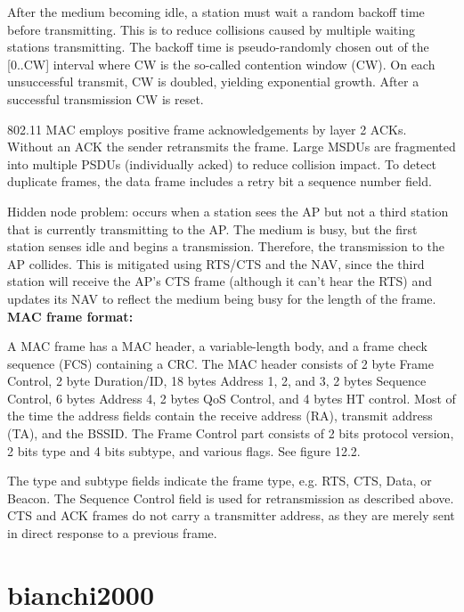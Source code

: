 After the medium becoming idle, a station must wait a random backoff time before transmitting. This is to reduce collisions caused by multiple waiting stations transmitting. The backoff time is pseudo-randomly chosen out of the [0..CW] interval where CW is the so-called contention window (CW). On each unsuccessful transmit, CW is doubled, yielding exponential growth. After a successful transmission CW is reset.

802.11 MAC employs positive frame acknowledgements by layer 2 ACKs. Without an ACK the sender retransmits the frame. Large MSDUs are fragmented into multiple PSDUs (individually acked) to reduce collision impact. To detect duplicate frames, the data frame includes a retry bit a sequence number field.

Hidden node problem: occurs when a station sees the AP but not a third station that is currently transmitting to the AP. The medium is busy, but the first station senses idle and begins a transmission. Therefore, the transmission to the AP collides. This is mitigated using RTS/CTS and the NAV, since the third station will receive the AP's CTS frame (although it can't hear the RTS) and updates its NAV to reflect the medium being busy for the length of the frame.\\

\textbf{MAC frame format:}

A MAC frame has a MAC header, a variable-length body, and a frame check sequence (FCS) containing a CRC. The MAC header consists of 2 byte Frame Control, 2 byte Duration/ID, 18 bytes Address 1, 2, and 3, 2 bytes Sequence Control, 6 bytes Address 4, 2 bytes QoS Control, and 4 bytes HT control. Most of the time the address fields contain the receive address (RA), transmit address (TA), and the BSSID. The Frame Control part consists of 2 bits protocol version, 2 bits type and 4 bits subtype, and various flags. See \cite{perahia2013} figure 12.2.

The type and subtype fields indicate the frame type, e.g. RTS, CTS, Data, or Beacon. The Sequence Control field is used for retransmission as described above. CTS and ACK frames do not carry a transmitter address, as they are merely sent in direct response to a previous frame.



\section{bianchi2000}

